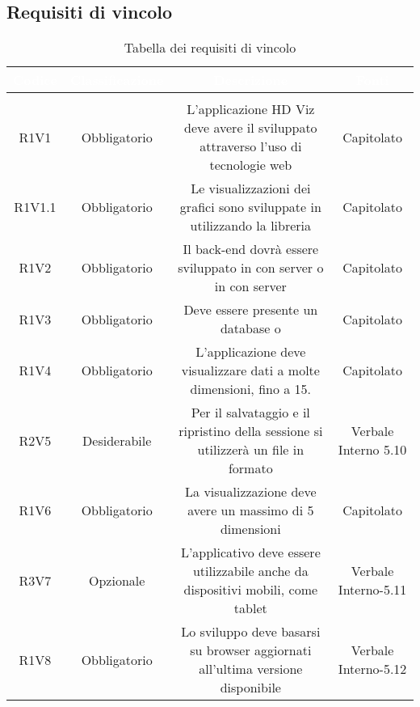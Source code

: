 \subsection{Requisiti di vincolo}
\renewcommand{\arraystretch}{1.5}
\begin{center}
\begin{longtable}{C{\colA} C{\colB} C{\colC} C{\colA}}
		\textcolor{white}{\textbf{Codice}} & 
		\textcolor{white}{\textbf{Classificazione}} & 
		\textcolor{white}{\textbf{Descrizione}} & 
		\textcolor{white}{\textbf{Fonti}} \\
		\endfirsthead
	    \\
	    \endfoot
	    \caption{Tabella dei requisiti di vincolo}
	    \endlastfoot

R1V1 & Obbligatorio & L'applicazione HD Viz deve avere il  sviluppato attraverso l'uso di tecnologie web & Capitolato \\
R1V1.1 & Obbligatorio & Le visualizzazioni dei grafici sono sviluppate in  utilizzando la libreria  & Capitolato\\
R1V2 & Obbligatorio & Il back-end dovrà essere sviluppato in  con server  o in  con server  & Capitolato \\
R1V3 & Obbligatorio & Deve essere presente un database  o  & Capitolato\\
R1V4 & Obbligatorio & L'applicazione deve visualizzare dati a molte dimensioni, fino a 15. & Capitolato\\
R2V5 & Desiderabile & Per il salvataggio e il ripristino della sessione si utilizzerà un file in formato  & Verbale Interno 5.10\\
R1V6 & Obbligatorio & La visualizzazione  deve avere un massimo di 5 dimensioni & Capitolato\\
R3V7 & Opzionale & L'applicativo deve essere utilizzabile anche da dispositivi mobili, come tablet & Verbale Interno-5.11\\
R1V8 & Obbligatorio & Lo sviluppo deve basarsi su browser aggiornati all'ultima versione disponibile & Verbale Interno-5.12\\



\end{longtable}
\end{center}